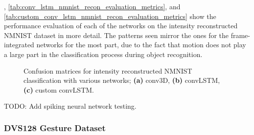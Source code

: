 , \cref{tab:conv_lstm_nmnist_recon_evaluation_metrics}, and \cref{tab:custom_conv_lstm_nmnist_recon_evaluation_metrics} show the performance evaluation of each of the networks on the intensity reconstructed NMNIST dataset in more detail. The patterns seen mirror the ones for the frame-integrated networks for the most part, due to the fact that motion does not play a large part in the classification process during object recognition.

\begin{figure}[htb]%
    \centering
    \qquad
    \qquad
    \caption{Confusion matrices for intensity reconstructed NMNIST classification with various networks; \textbf{(a)} conv3D, \textbf{(b)} convLSTM, \textbf{(c)} custom convLSTM.}%
    \label{fig:nmnist_recon_c_matrices}%
\end{figure}

\color{red} TODO: Add spiking neural network testing. \color{black}

\subsubsection{DVS128 Gesture Dataset}

